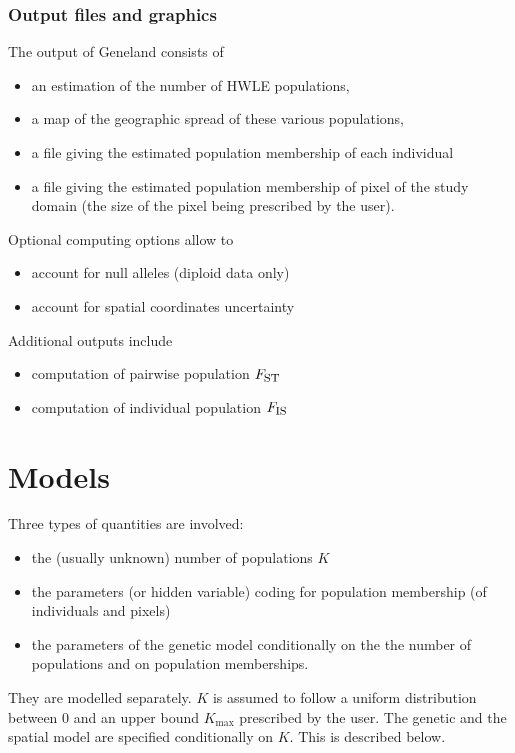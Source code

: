 \documentclass[a4paper,10pt]{article}
\newcommand{\Fst}{F_{\mbox{\footnotesize ST}}}
\newcommand{\Fis}{F_{\mbox{\footnotesize IS}}}
\begin{document}
\subsubsection{Output files and graphics}

The output of {\sc Geneland} consists of 
\begin{itemize}
\item an estimation of the number of HWLE populations, 
\item a map of the geographic spread of these various populations, 
\item a file giving  the estimated population membership of each individual
\item a file giving  the estimated population membership of pixel of the study domain (the size of the pixel 
being prescribed by the user).
\end{itemize}

Optional computing options allow to 
\begin{itemize}
\item account for null alleles (diploid data only)
\item account for spatial coordinates uncertainty
\end{itemize}

Additional outputs include
\begin{itemize}
\item computation of pairwise population $\Fst$
\item computation of individual population $\Fis$
\end{itemize}



\section{Models}\label{sec:models}

Three types of quantities are involved:
\begin{itemize}
\item  the (usually unknown) number of populations $K$ 
\item the parameters (or hidden variable) coding for population membership (of individuals and pixels)
\item the parameters of the genetic model conditionally on the the number of populations and on 
population memberships.
 \end{itemize}

They are modelled separately. $K$ is assumed to follow a uniform distribution between 0 and 
an upper bound $K_{\max}$ 
prescribed by the user. The genetic and the spatial model are specified conditionally on $K$. 
This is described below. 
\end{document}
